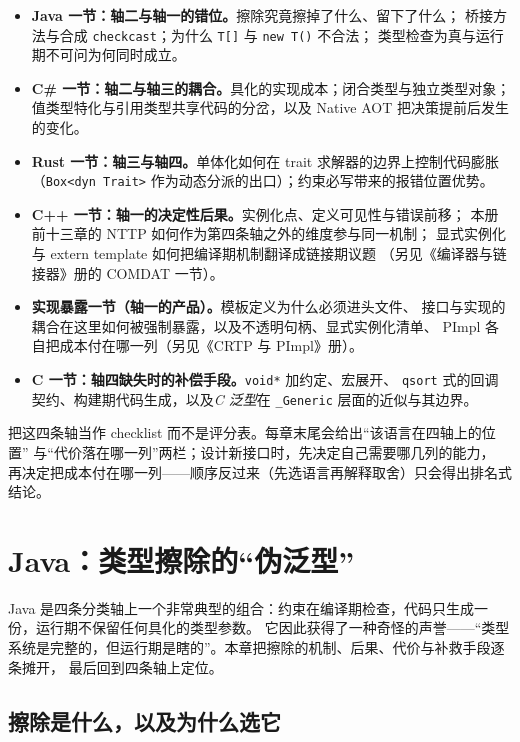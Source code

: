 \documentclass[12pt,a4paper,fontset=fandol]{ctexbook}
\newcommand{\cpp}[1]{C++#1}
\newcommand{\kw}[1]{\texttt{#1}}
\begin{document}
\begin{itemize}
\item \textbf{Java 一节：轴二与轴一的错位。}擦除究竟擦掉了什么、留下了什么；
桥接方法与合成 \kw{checkcast}；为什么 \kw{T[]} 与 \kw{new T()} 不合法；
类型检查为真与运行期不可问为何同时成立。
\item \textbf{C\# 一节：轴二与轴三的耦合。}具化的实现成本；闭合类型与独立类型对象；
值类型特化与引用类型共享代码的分岔，以及 Native AOT 把决策提前后发生的变化。
\item \textbf{Rust 一节：轴三与轴四。}单体化如何在 trait 求解器的边界上控制代码膨胀
（\kw{Box<dyn Trait>} 作为动态分派的出口）；约束必写带来的报错位置优势。
\item \textbf{\cpp{} 一节：轴一的决定性后果。}实例化点、定义可见性与错误前移；
本册前十三章的 NTTP 如何作为第四条轴之外的维度参与同一机制；
显式实例化与 extern template 如何把编译期机制翻译成链接期议题
（另见《编译器与链接器》册的 COMDAT 一节）。
\item \textbf{实现暴露一节（轴一的产品）。}模板定义为什么必须进头文件、
接口与实现的耦合在这里如何被强制暴露，以及不透明句柄、显式实例化清单、
PImpl 各自把成本付在哪一列（另见《CRTP 与 PImpl》册）。
\item \textbf{C 一节：轴四缺失时的补偿手段。}\kw{void*} 加约定、宏展开、
\kw{qsort} 式的回调契约、构建期代码生成，以及\emph{C 泛型}在 \kw{\_Generic}
层面的近似与其边界。
\end{itemize}

\begin{bestpractice}[title={读后面五章时的用法}]
把这四条轴当作 checklist 而不是评分表。每章末尾会给出“该语言在四轴上的位置”
与“代价落在哪一列”两栏；设计新接口时，先决定自己需要哪几列的能力，
再决定把成本付在哪一列——顺序反过来（先选语言再解释取舍）只会得出排名式结论。
\end{bestpractice}

\chapter{Java：类型擦除的“伪泛型”}

Java 是四条分类轴上一个非常典型的组合：约束在编译期检查，代码只生成一份，运行期不保留任何具化的类型参数。
它因此获得了一种奇怪的声誉——“类型系统是完整的，但运行期是瞎的”。本章把擦除的机制、后果、代价与补救手段逐条摊开，
最后回到四条轴上定位。

\section{擦除是什么，以及为什么选它}
\end{document}
